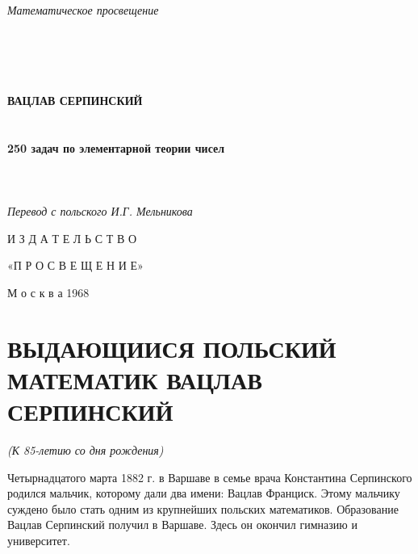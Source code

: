 \documentclass[12pt, a4paper, openany]{book}
\begin{document}
	
	\begin{titlepage}
		
		\begin{center}
			
			\vspace*{\fill}
			\begin{flushleft}
		{\large	\textit{Математическое просвещение}			}
			\end{flushleft}
			\ \\
\ \\
			\ \\
\ \\
			{\large\bf ВАЦЛАВ СЕРПИНСКИЙ\\}
			\ \\
			\ \\
			{\Huge\bf 250 задач по элементарной теории чисел\\}
			\ \\
			\ \\
			\ \\
			\textit{Перевод с польского И.Г. Мельникова}

			\vspace*{\fill}    
			
			\vfill
			
И З Д А Т Е Л Ь С Т В О

«П Р О С В Е Щ Е Н И Е»

М о с к в а 1968
		\end{center}
		
	\end{titlepage}
	
	\thispagestyle{empty} %
	
	\newpage
	
\setcounter{secnumdepth}{0}  
	
	\section[Выдающийся польский математик Вацлав Серпинский (к 85-летию со дня рождения)]{\center ВЫДАЮЩИИСЯ ПОЛЬСКИЙ МАТЕМАТИК ВАЦЛАВ СЕРПИНСКИЙ}
		\begin{center}
\textit{(К 85-летию со дня рождения)}
\end{center}
	
	Четырнадцатого марта 1882 г. в Варшаве в семье врача Константина Серпинского родился мальчик, которому дали два имени: Вацлав Франциск. Этому мальчику суждено было стать одним из крупнейших польских математиков.
	Образование Вацлав Серпинский получил в Варшаве. Здесь он окончил гимназию и университет.
\end{document}

